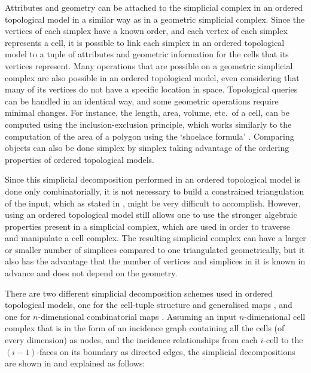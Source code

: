 Attributes and geometry can be attached to the simplicial complex in an ordered topological model in a similar way as in a geometric simplicial complex.
Since the vertices of each simplex have a known order, and each vertex of each simplex represents a cell, it is possible to link each simplex in an ordered topological model to a tuple of attributes and geometric information for the cells that its vertices represent.
Many operations that are possible on a geometric simplicial complex are also possible in an ordered topological model, even considering that many of its vertices do not have a specific location in space.
Topological queries can be handled in an identical way, and some geometric operations require minimal changes.
For instance, the length, area, volume, etc.\ of a cell, can be computed using the inclusion-exclusion principle, which works similarly to the computation of the area of a polygon using the `shoelace formula' \citep{Meister71}.
Comparing objects can also be done simplex by simplex \citep{Gosselin11} taking advantage of the ordering properties of ordered topological models.

Since this simplicial decomposition performed in an ordered topological model is done only combinatorially, it is not necessary to build a constrained triangulation of the input, which as stated in , might be very difficult to accomplish.
However, using an ordered topological model still allows one to use the stronger algebraic properties present in a simplicial complex, which are used in order to traverse and manipulate a cell complex.
The resulting simplicial complex can have a larger or smaller number of simplices compared to one triangulated geometrically, but it also has the advantage that the number of vertices and simplices in it is known in advance and does not depend on the geometry.

There are two different simplicial decomposition schemes used in ordered topological models, one for the cell-tuple structure \citep{Brisson89} and generalised maps \citep{Lienhardt94}, and one for $n$-dimensional combinatorial maps \citep{Lienhardt94}.
Assuming an input $n$-dimensional cell complex that is in the form of an incidence graph containing all the cells (of every dimension) as nodes, and the incidence relationships from each $i$-cell to the $(i-1)$-faces on its boundary as directed edges, the simplicial decompositions are shown in  and explained as follows:

